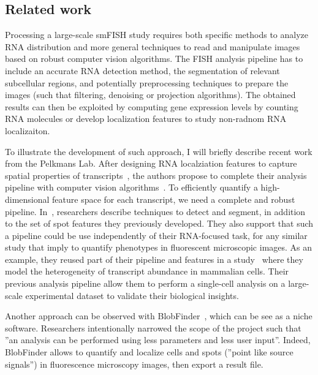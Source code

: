 
\subsection{Related work}
\label{subsec:related_work_fishquant}

Processing a large-scale \ac{smFISH} study requires both specific methods to analyze \ac{RNA} distribution and more general techniques to read and manipulate images based on robust computer vision algorithms.
The \ac{FISH} analysis pipeline has to include an accurate \ac{RNA} detection method, the segmentation of relevant subcellular regions, and potentially preprocessing techniques to prepare the images (such that filtering, denoising or projection algorithms).
The obtained results can then be exploited by computing gene expression levels by counting \ac{RNA} molecules or develop localization features to study non-radnom RNA localizaiton.

To illustrate the development of such approach, I will briefly describe recent work from the Pelkmans Lab. 
After designing RNA localziation features to capture spatial properties of transcripts~\cite{battich_image-based_2013}, the authors propose to complete their analysis pipeline with computer vision algorithms~\cite{stoeger_computer_2015}.
To efficiently quantify a high-dimensional feature space for each transcript, we need a complete and robust pipeline.
In~\cite{stoeger_computer_2015}, researchers describe techniques to detect and segment, in addition to the set of spot features they previously developed.
They also support that such a pipeline could be use independently of their \ac{RNA}-focused task, for any similar study that imply to quantify phenotypes in fluorescent microscopic images.
As an example, they reused part of their pipeline and features in a study~\cite{battich_control_2015} where they model the heterogeneity of transcript abundance in mammalian cells.
Their previous analysis pipeline allow them to perform a single-cell analysis on a large-scale experimental dataset to validate their biological insights.

Another approach can be observed with BlobFinder~\cite{ALLALOU200958}, which can be see as a niche software.
Researchers intentionally narrowed the scope of the project such that ''an analysis can be performed using less parameters and less user input''.
Indeed, BlobFinder allows to quantify and localize cells and spots (''point like source signals'') in fluorescence microscopy images, then export a result file.

